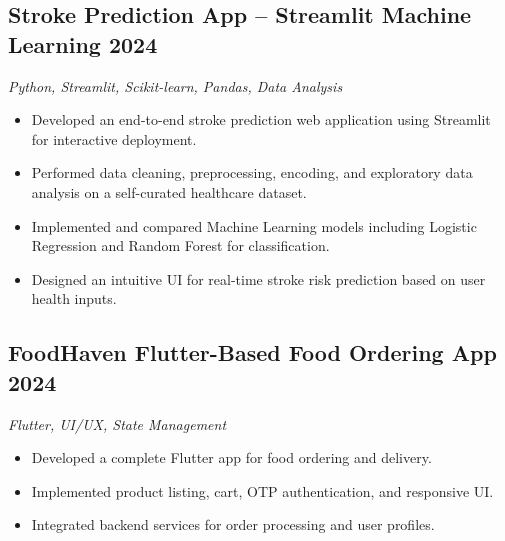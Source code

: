 \newpage

\subsection{Stroke Prediction App – Streamlit Machine Learning \hfill 2024}
\textit{Python, Streamlit, Scikit-learn, Pandas, Data Analysis}
\begin{itemize}
  \item Developed an end-to-end stroke prediction web application using Streamlit for interactive deployment.
  \item Performed data cleaning, preprocessing, encoding, and exploratory data analysis on a self-curated healthcare dataset.
  \item Implemented and compared Machine Learning models including Logistic Regression and Random Forest for classification.
  \item Designed an intuitive UI for real-time stroke risk prediction based on user health inputs.
\end{itemize}

\subsection{FoodHaven Flutter-Based Food Ordering App \hfill 2024}
\textit{Flutter, UI/UX, State Management}
\begin{itemize}
  \item Developed a complete Flutter app for food ordering and delivery.
  \item Implemented product listing, cart, OTP authentication, and responsive UI.
  \item Integrated backend services for order processing and user profiles.
\end{itemize}


